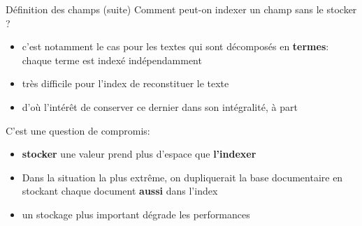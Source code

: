 \begin{frame}[fragile]{Définition des champs (suite)}
Comment peut-on indexer un champ sans le stocker ?
  \begin{itemize}
    \item c'est notamment le cas pour les textes qui sont décomposés en
      {\bf termes}: chaque terme est indexé indépendamment
    \item très difficile pour l'index de reconstituer le texte
    \item d'où l'intérêt de conserver ce dernier dans son  intégralité, à part
  \end{itemize}

\vfill

C'est une question de compromis: 
\begin{itemize}
  \item {\bf stocker} une valeur prend plus d'espace que {\bf l'indexer}
  \item Dans la situation la plus extrême, on dupliquerait la base documentaire
    en stockant chaque document {\bf aussi} dans l'index
  \item un stockage plus important dégrade les performances
\end{itemize}

\end{frame}

